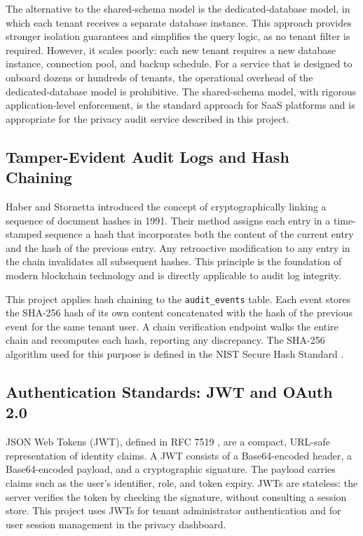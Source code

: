 \documentclass[a4paper,12pt,onecolumn]{report}
\begin{document}
The alternative to the shared-schema model is the dedicated-database model, in which each tenant receives a separate database instance.
This approach provides stronger isolation guarantees and simplifies the query logic, as no tenant filter is required.
However, it scales poorly: each new tenant requires a new database instance, connection pool, and backup schedule.
For a service that is designed to onboard dozens or hundreds of tenants, the operational overhead of the dedicated-database model is prohibitive.
The shared-schema model, with rigorous application-level enforcement, is the standard approach for SaaS platforms and is appropriate for the privacy audit service described in this project.

\subsection{Tamper-Evident Audit Logs and Hash Chaining}

Haber and Stornetta \cite{hashchain} introduced the concept of cryptographically linking a sequence of document hashes in 1991.
Their method assigns each entry in a time-stamped sequence a hash that incorporates both the content of the current entry and the hash of the previous entry.
Any retroactive modification to any entry in the chain invalidates all subsequent hashes.
This principle is the foundation of modern blockchain technology and is directly applicable to audit log integrity.

This project applies hash chaining to the \texttt{audit\_events} table.
Each event stores the SHA-256 hash of its own content concatenated with the hash of the previous event for the same tenant user.
A chain verification endpoint walks the entire chain and recomputes each hash, reporting any discrepancy.
The SHA-256 algorithm used for this purpose is defined in the NIST Secure Hash Standard \cite{sha256}.

\subsection{Authentication Standards: JWT and OAuth 2.0}

JSON Web Tokens (JWT), defined in RFC 7519 \cite{rfc7519}, are a compact, URL-safe representation of identity claims.
A JWT consists of a Base64-encoded header, a Base64-encoded payload, and a cryptographic signature.
The payload carries claims such as the user's identifier, role, and token expiry.
JWTs are stateless: the server verifies the token by checking the signature, without consulting a session store.
This project uses JWTs for tenant administrator authentication and for user session management in the privacy dashboard.
\end{document}

